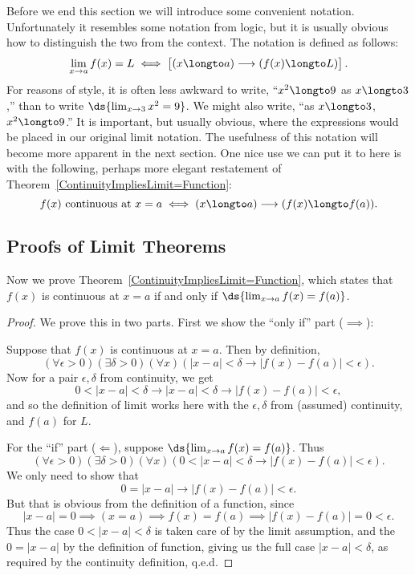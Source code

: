 Before we end this section we will introduce some convenient
notation.  Unfortunately it resembles some notation
from logic, but it is usually obvious how to distinguish
the two from the context.  The notation is defined
as follows:
\begin{equation}
\lim_{x\to a}f(x)=L
\iff \left[\vphantom{X^X_X}(x\longto a)\longrightarrow (f(x)\longto L)\right].
\end{equation}
For reasons of style, it is often less awkward to write,
``$x^2\longto 9$ as $x\longto 3$,'' than to write $\ds{\lim_{x\to3}x^2=9}$.
We might also write, ``as $x\longto3$, $x^2\longto 9$.'' 
It is important, but usually obvious, where the expressions
would be placed in our original limit notation.
The usefulness of this notation will become more apparent
in the next section.  One nice use we can put it to here
is with the following, perhaps more elegant restatement 
of Theorem~\ref{ContinuityImpliesLimit=Function}:
\begin{equation}
f(x)\text{ continuous at }x=a \iff 
(x\longto a)\longrightarrow( f(x)\longto f(a)).
\end{equation}
\subsection{Proofs of Limit Theorems}
Now we prove Theorem~\ref{ContinuityImpliesLimit=Function},
which states that 
$f(x)$ is continuous at $x=a$
if and only if $\ds{\lim_{x\to a}f(x)=f(a)}$.


\begin{proof}
We prove this in two parts.  First we show the ``only if'' part ($\implies$):

Suppose that $f(x)$ is continuous at $x=a$.  Then
by definition,
$$(\forall \epsilon>0)(\exists\delta>0)(\forall x)
\left(|x-a|<\delta\longrightarrow|f(x)-f(a)|<\epsilon\right).$$
Now for a pair $\epsilon,\delta$ from continuity, we get
$$0<|x-a|<\delta\longrightarrow|x-a|<\delta
\longrightarrow|f(x)-f(a)|<\epsilon,$$
and so the definition of limit works here with the 
$\epsilon,\delta$ from (assumed) continuity, and $f(a)$ for $L$.



For the ``if'' part ($\Longleftarrow$),
 suppose $\ds{\lim_{x\to a}f(x)=f(a)}$.  
Thus 
$$(\forall\epsilon>0)(\exists\delta>0)(\forall x)
(0<|x-a|<\delta\longrightarrow|f(x)-f(a)|<\epsilon).$$
We only need to show that 
$$0=|x-a|\longrightarrow|f(x)-f(a)|<\epsilon.$$
But that is obvious from the definition of a function,
since 
$$|x-a|=0\implies (x=a)\implies f(x)=f(a)\implies
|f(x)-f(a)|=0<\epsilon.$$  Thus the case $0<|x-a|<\delta$
is taken care of by the limit assumption, and the
$0=|x-a|$ by the definition of function, giving us
the full case $|x-a|<\delta$, as required by the continuity
definition, q.e.d.
\end{proof}

